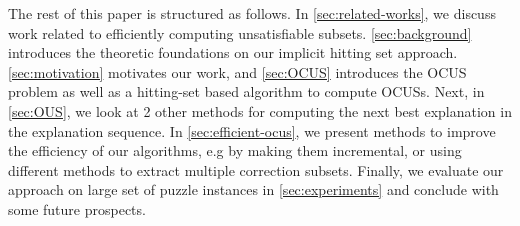 \documentclass[twoside,11pt]{article}
\newcommand\comment[1]{\marginpar{\tiny #1}}
\renewcommand\comment[1]{#1}
\newcommand{\bart}[1]{{\comment{\color{OliveGreen}Bart: #1}}}
\newcommand\mm[1]{\ensuremath{#1}\xspace}
\newcommand\call[1]{\mm{\texttt{#1}}}
\newcommand\comus{\mm{\call{OCUS}}}
\begin{document}
The rest of this paper is structured as follows. 
In \cref{sec:related-works}, we discuss work related to efficiently computing unsatisfiable subsets. \cref{sec:background} introduces the theoretic foundations on our implicit hitting set approach. \cref{sec:motivation} motivates our work, and \cref{sec:OCUS} introduces the OCUS problem as well as a hitting-set based algorithm to compute OCUSs. Next, in \cref{sec:OUS}, we look at 2 other methods for computing the next best explanation in the explanation sequence. In \cref{sec:efficient-ocus}, we present methods to improve the efficiency of our algorithms, e.g by making them incremental, or using different methods to extract multiple correction subsets.
Finally, we evaluate our approach on large set of puzzle instances in \cref{sec:experiments} and conclude with some future prospects.

\end{document}
